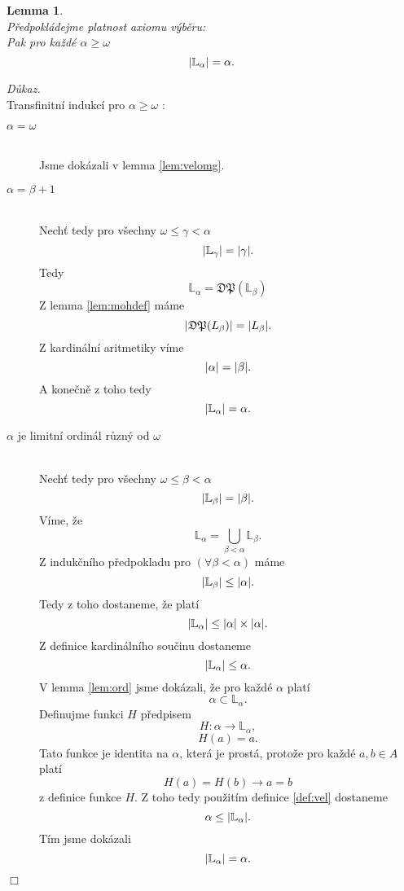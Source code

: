 \documentclass[12pt,a4paper]{article}
\newtheorem{lemma}[veta]{Lemma}
\newenvironment{proof}
{\noindent \textit{D\r{u}kaz.}}
{\hspace*{\fill} $\Box$}
\begin{document}
\begin{lemma}
~\\
P\v{r}edpokl\'{a}dejme platnost axiomu v\'{y}b\v{e}ru:\\
Pak pro ka\v{z}d\'{e} $ \alpha \geq \omega  $
\[ \arrowvert \mathbb{L}_\alpha \arrowvert = \alpha .\]
\label{lem:velalp}
\end{lemma}
\begin{proof}~\\
Transfinitn\'{i} indukc\'{i} pro $ \alpha \geq \omega  $ :
\begin{description}
  \item[$ \alpha=\omega $] ~\\
Jsme dok\'{a}zali v lemma \ref{lem:velomg}.
  \item[$ \alpha=\beta +1 $]~\\
  Nech\v{t} tedy pro v\v{s}echny $\omega \leq \gamma < \alpha $ 
  \[ \arrowvert \mathbb{L}_\gamma \arrowvert = \arrowvert \gamma \arrowvert .\]
Tedy \[\mathbb{L}_\alpha=\mathfrak{DP}(\mathbb{L}_\beta)\]
   Z lemma \ref{lem:mohdef} m\'{a}me 
   \[ \arrowvert\mathfrak{DP}(L_\beta)\arrowvert=\arrowvert L_\beta \arrowvert.\]
   Z kardin\'{a}ln\'{i} aritmetiky v\'{i}me 
   \[ \arrowvert \alpha \arrowvert = \arrowvert \beta \arrowvert. \]
A kone\v{c}n\v{e} z toho tedy 
\[ \arrowvert \mathbb{L}_\alpha \arrowvert = \alpha .\]   
 \item[$ \alpha $ je limitn\'{i} ordin\'{a}l r\r{u}zn\'{y} od $ \omega $]~\\
  Nech\v{t} tedy pro v\v{s}echny $\omega \leq \beta< \alpha $ 
   \[ \arrowvert \mathbb{L}_\beta \arrowvert = \arrowvert \beta \arrowvert .\]
  V\'{i}me, \v{z}e
 \[ \mathbb{L}_\alpha = \bigcup_{\beta < \alpha}\mathbb{L}_\beta .\]
 Z induk\v{c}n\'{i}ho p\v{r}edpokladu pro $ (\forall \beta < \alpha) $ m\'{a}me
\[  \arrowvert \mathbb{L}_\beta \arrowvert \leq \arrowvert \alpha \arrowvert.\]
Tedy z toho dostaneme, \v{z}e plat\'{i} 
\[ \arrowvert \mathbb{L}_\alpha \arrowvert \leq  \arrowvert \alpha \arrowvert   \times \arrowvert  \alpha \arrowvert  .\]
 Z definice kardin\'{a}ln\'{i}ho sou\v{c}inu dostaneme
\[  \arrowvert \mathbb{L}_\alpha \arrowvert \leq  \alpha .\]
V lemma \ref{lem:ord} jsme dok\'{a}zali, \v{z}e pro ka\v{z}d\'{e} $ \alpha $ plat\'{i} \[ \alpha \subset \mathbb{L}_\alpha .\]
Definujme funkci $ H $ p\v{r}edpisem 
\[ H: \alpha \rightarrow \mathbb{L}_\alpha ,\]
\[ H(a)=a   .\]
Tato funkce je identita na $ \alpha $, kter\'{a} je  prost\'{a}, proto\v{z}e pro ka\v{z}d\'{e} $ a,b \in A $ plat\'{i}\[ H(a)=H(b) \rightarrow a=b \]  z definice funkce $ H $. Z toho tedy pou\v{z}it\'{i}m definice \ref{def:vel} dostaneme
\[\alpha  \leq \arrowvert \mathbb{L}_\alpha \arrowvert  .\]
T\'{i}m jsme dok\'{a}zali
\[ \arrowvert \mathbb{L}_\alpha \arrowvert = \alpha .\]
\end{description}
\end{proof}
\end{document}
